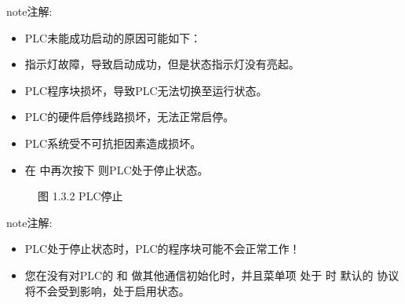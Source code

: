 \documentclass[a4paper,10pt,english]{sphinxmanual}
\begin{document}
\begin{sphinxadmonition}{note}{注解:}\begin{itemize}
\item {} 
\sphinxAtStartPar
PLC未能成功启动的原因可能如下：

\item {} 
\sphinxAtStartPar
{} 指示灯故障，导致启动成功，但是状态指示灯没有亮起。

\item {} 
\sphinxAtStartPar
PLC程序块损坏，导致PLC无法切换至运行状态。

\item {} 
\sphinxAtStartPar
PLC的硬件启停线路损坏，无法正常启停。

\item {} 
\sphinxAtStartPar
PLC系统受不可抗拒因素造成损坏。

\end{itemize}
\end{sphinxadmonition}
\begin{itemize}
\item {} 
\sphinxAtStartPar
在  中再次按下  则PLC处于停止状态。

\end{itemize}

\begin{figure}[htbp]
\centering
\capstart

\noindent{}
\caption{图 1.3.2 PLC停止}\label{\detokenize{operation_guide:id7}}\end{figure}

\begin{sphinxadmonition}{note}{注解:}\begin{itemize}
\item {} 
\sphinxAtStartPar
PLC处于停止状态时，PLC的程序块可能不会正常工作！

\item {} 
\sphinxAtStartPar
您在没有对PLC的  和  做其他通信初始化时，并且菜单项  处于  时
默认的  协议将不会受到影响，处于启用状态。

\end{itemize}
\end{sphinxadmonition}

\sphinxAtStartPar
{}
\end{document}
